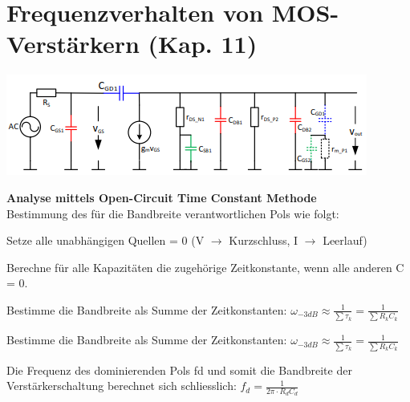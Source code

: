 
\section{Frequenzverhalten von MOS-Verstärkern (Kap. 11)}
\begin{minipage}[c]{0.5\textwidth}
	\includegraphics[width=1\linewidth]{chapters/Frequenzverhalten/images/parasitaere_kapazitaeten}
\end{minipage}
\begin{minipage}[c]{0.5\textwidth}
\textbf{Analyse mittels Open-Circuit Time Constant Methode} \\
Bestimmung des für die Bandbreite verantwortlichen Pols wie folgt:
\begin{compactenum}
	\item Setze alle unabhängigen Quellen = 0 (V $\rightarrow$ Kurzschluss, I $\rightarrow$ Leerlauf)
	\item Berechne für alle Kapazitäten die zugehörige Zeitkonstante, wenn alle anderen C = 0.
	\item Bestimme die Bandbreite als Summe der Zeitkonstanten: $\omega_{-3dB}\approx \frac{1}{\sum\tau_k}=\frac{1}{\sum R_kC_k}$
\end{compactenum}
\end{minipage}
\begin{compactenum}
	\setcounter{enumi}{3}
	\item Bestimme die Bandbreite als Summe der Zeitkonstanten: $\omega_{-3dB}\approx \frac{1}{\sum\tau_k}=\frac{1}{\sum R_kC_k}$
\end{compactenum}
Die Frequenz des dominierenden Pols fd und somit die Bandbreite der Verstärkerschaltung berechnet sich schliesslich: $f_d=\frac{1}{2\pi \cdot R_dC_d}$

